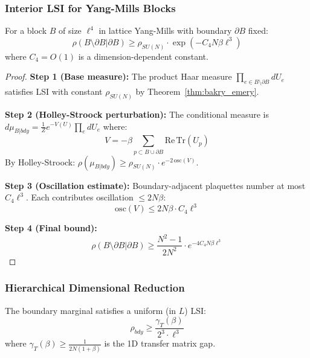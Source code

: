 \subsubsection{Interior LSI for Yang-Mills Blocks}

\begin{theorem}
\label{thm:interior_lsi}
For a block $B$ of size $\ell^4$ in lattice Yang-Mills with boundary $\partial B$ fixed:
\begin{equation}
\rho(B \setminus \partial B | \partial B) \geq \rho_{SU(N)} \cdot \exp\left(-C_4 N \beta \ell^3\right)
\end{equation}
where $C_4 = O(1)$ is a dimension-dependent constant.
\end{theorem}

\begin{proof}
\textbf{Step 1 (Base measure):}
The product Haar measure $\prod_{e \in B \setminus \partial B} dU_e$ satisfies LSI with constant $\rho_{SU(N)}$ by Theorem~\ref{thm:bakry_emery}.

\textbf{Step 2 (Holley-Stroock perturbation):}
The conditional measure is $d\mu_{B|bdy} = \frac{1}{Z} e^{-V(U)} \prod_e dU_e$ where:
\begin{equation}
V = -\beta \sum_{p \subset B \cup \partial B} \mathrm{Re}\,\mathrm{Tr}(U_p)
\end{equation}
By Holley-Stroock: $\rho(\mu_{B|bdy}) \geq \rho_{SU(N)} \cdot e^{-2\,\mathrm{osc}(V)}$.

\textbf{Step 3 (Oscillation estimate):}
Boundary-adjacent plaquettes number at most $C_4 \ell^3$. Each contributes oscillation $\leq 2N\beta$:
\begin{equation}
\mathrm{osc}(V) \leq 2N\beta \cdot C_4 \ell^3
\end{equation}

\textbf{Step 4 (Final bound):}
\begin{equation}
\rho(B \setminus \partial B | \partial B) \geq \frac{N^2-1}{2N^2} \cdot e^{-4C_4 N\beta \ell^3}
\end{equation}
\end{proof}

\subsubsection{Hierarchical Dimensional Reduction}

\begin{theorem}
\label{thm:boundary_lsi}
The boundary marginal satisfies a uniform (in $L$) LSI:
\begin{equation}
\rho_{bdy} \geq \frac{\gamma_T(\beta)}{2^3 \cdot \ell^3}
\end{equation}
where $\gamma_T(\beta) \geq \frac{1}{2N(1+\beta)}$ is the 1D transfer matrix gap.
\end{theorem}


